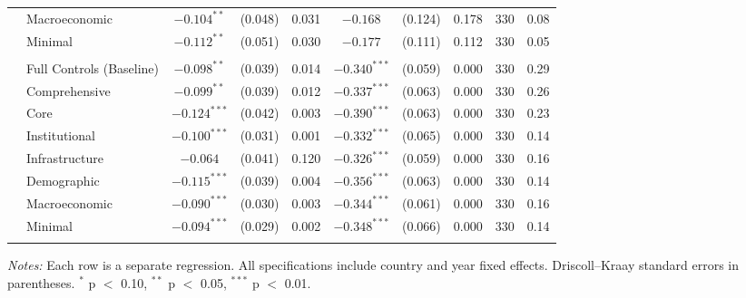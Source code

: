 \begin{table}[!htbp]
\begin{minipage}{\textwidth}
\begin{adjustbox}{width=\textwidth}
\begin{tabular}{llcccccccc}
 & Macroeconomic & $-0.104^{**}$ & (0.048) & 0.031 & $-0.168$ & (0.124) & 0.178 & 330 & 0.08 \\
 & Minimal & $-0.112^{**}$ & (0.051) & 0.030 & $-0.177$ & (0.111) & 0.112 & 330 & 0.05 \\
\addlinespace
\multicolumn{10}{l}{\textit{Price: USD}} \\
 & Full Controls (Baseline) & $-0.098^{**}$ & (0.039) & 0.014 & $-0.340^{***}$ & (0.059) & 0.000 & 330 & 0.29 \\
 & Comprehensive & $-0.099^{**}$ & (0.039) & 0.012 & $-0.337^{***}$ & (0.063) & 0.000 & 330 & 0.26 \\
 & Core & $-0.124^{***}$ & (0.042) & 0.003 & $-0.390^{***}$ & (0.063) & 0.000 & 330 & 0.23 \\
 & Institutional & $-0.100^{***}$ & (0.031) & 0.001 & $-0.332^{***}$ & (0.065) & 0.000 & 330 & 0.14 \\
 & Infrastructure & $-0.064$ & (0.041) & 0.120 & $-0.326^{***}$ & (0.059) & 0.000 & 330 & 0.16 \\
 & Demographic & $-0.115^{***}$ & (0.039) & 0.004 & $-0.356^{***}$ & (0.063) & 0.000 & 330 & 0.14 \\
 & Macroeconomic & $-0.090^{***}$ & (0.030) & 0.003 & $-0.344^{***}$ & (0.061) & 0.000 & 330 & 0.16 \\
 & Minimal & $-0.094^{***}$ & (0.029) & 0.002 & $-0.348^{***}$ & (0.066) & 0.000 & 330 & 0.14 \\
\addlinespace
\bottomrule
\end{tabular}
\end{adjustbox}
\par\vspace{4pt}
\scriptsize
\textit{Notes:} Each row is a separate regression. All specifications include country
and year fixed effects. Driscoll--Kraay standard errors in parentheses.
$^{*}$ p $<$ 0.10, $^{**}$ p $<$ 0.05, $^{***}$ p $<$ 0.01.
\end{minipage}
\end{table}
